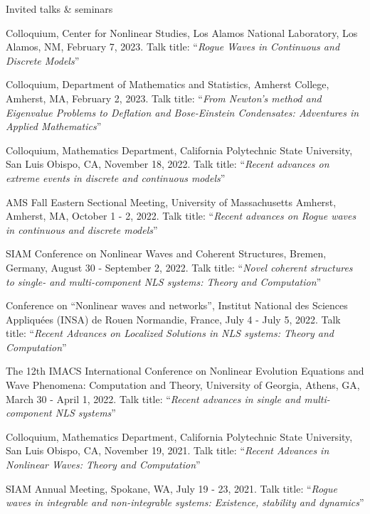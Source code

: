 \documentclass[10pt]{article} %
\begin{document}
\begin{section}{Invited talks \& seminars}
\begin{etaremune}
\item Colloquium, Center for Nonlinear Studies, Los Alamos National Laboratory, Los Alamos, NM, February 7, 2023. 
      Talk title: ``\textit{Rogue Waves in Continuous and Discrete Models}''

\item Colloquium, Department of Mathematics and Statistics, Amherst College, Amherst, MA, February 2, 2023. 
Talk title: ``\textit{From Newton's method and Eigenvalue Problems to Deflation and Bose-Einstein 
Condensates: Adventures in Applied Mathematics}''


\item Colloquium, Mathematics Department, California Polytechnic State University, San Luis Obispo, CA, November 18, 2022. 
Talk title: ``\textit{Recent advances on extreme events in discrete and continuous models}''

\item AMS Fall Eastern Sectional Meeting, University of Massachusetts Amherst, Amherst, MA, October 1 - 2, 2022.
Talk title: ``\textit{Recent advances on Rogue waves in continuous and discrete models}''

\item SIAM Conference on Nonlinear Waves and Coherent Structures, Bremen, Germany, August 30 - September 2, 2022.
Talk title: ``\textit{Novel coherent structures to single- and multi-component NLS systems: Theory and Computation}''

\item Conference on ``Nonlinear waves and networks'', Institut National des Sciences Appliqu\'ees %
(INSA) de Rouen Normandie, France, July 4 - July 5, 2022. %
Talk title: ``\textit{Recent Advances on Localized Solutions in NLS systems: Theory and Computation}''

\item The 12th IMACS International Conference on Nonlinear Evolution Equations and Wave Phenomena: Computation and Theory, %
        University of Georgia, Athens, GA, March 30 - April 1, 2022. 
        Talk title: ``\textit{Recent advances in single and multi-component NLS systems}''

\item Colloquium, Mathematics Department, California Polytechnic State University, San Luis Obispo, CA, November 19, 2021. 
Talk title: ``\textit{Recent Advances in Nonlinear Waves: Theory and Computation}'' 
        
\item SIAM Annual Meeting, Spokane, WA, July 19 - 23, 2021. Talk title: 
``\textit{Rogue waves in integrable and non-integrable systems: Existence, stability and dynamics}''


\end{etaremune}
\end{section}
\end{document}

